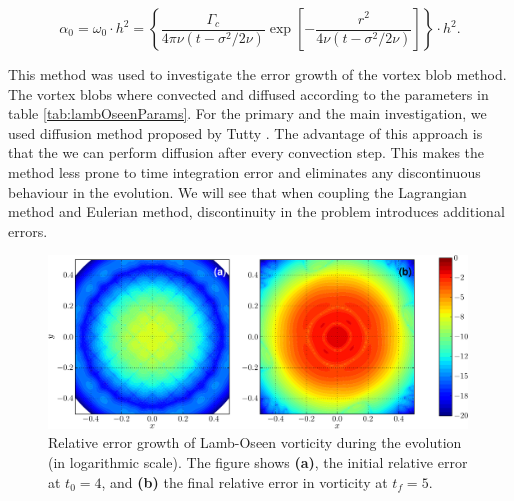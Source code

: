 	\begin{equation}
	\alpha_0 = \omega_0\cdot h^2 = \left\{ \frac{\Gamma_c}{4\pi\nu\left(t-\sigma^2/2\nu\right)} \exp\left[-\frac{r^2}{4\nu\left(t-\sigma^2/2\nu\right)}\right] \right\} \cdot h^2.
\end{equation}
	
This method was used to investigate the error growth of the vortex blob method. The vortex blobs where convected and diffused according to the parameters in table \ref{tab:lambOseenParams}. For the primary and the main investigation, we used diffusion method proposed by Tutty \cite{Tutty2010a}. The advantage of this approach is that the we can perform diffusion after every convection step. This makes the method less prone to time integration error and eliminates any discontinuous behaviour in the evolution. We will see that when coupling the Lagrangian method and Eulerian method, discontinuity in the problem introduces additional errors.

	\begin{figure}[p]
	\centering
	\includegraphics[width=0.99\textwidth]{figures/lagrangian/lambOseen_convection_vorticityErrorContours_compressed-crop.pdf}
	\caption{Relative error growth of Lamb-Oseen vorticity during the evolution (in logarithmic scale). The figure shows \textbf{(a)}, the initial relative error at $t_0=4$, and \textbf{(b)} the final relative error in vorticity at $t_f=5$.}
	\label{fig:lambOseen_convection_vorticityErrorContours_compressed}
	\end{figure}

